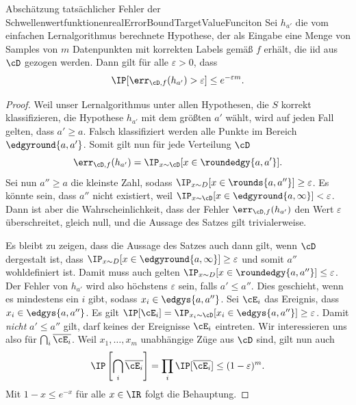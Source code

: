 \documentclass[language=ngerman,algolist,acrolist]{TemplateLecture}
\begin{document}
\begin{thm}{Abschätzung tatsächlicher Fehler der Schwellenwertfunktionen}{realErrorBoundTargetValueFunciton}
    Sei $h_{a'}$ die vom einfachen Lernalgorithmus berechnete Hypothese, der als Eingabe eine Menge von Samples von $m$ Datenpunkten mit korrekten Labels gemäß $f$ erhält, die \ac{iid} aus $\cD$ gezogen werden. Dann gilt für alle $\varepsilon > 0$, dass
    \begin{equation*}
        \IP[\err_{\cD, f}(h_{a'}) > \varepsilon] \leq e^{-\varepsilon m}.
    \end{equation*}
\end{thm}
\begin{proof}
    Weil unser Lernalgorithmus unter allen Hypothesen, die $S$ korrekt klassifizieren, die Hypothese $h_{a'}$ mit dem größten $a'$ wählt, wird auf jeden Fall gelten, dass $a' \geq a$. Falsch klassifiziert werden alle Punkte im Bereich $\edgyround{a, a'}$. Somit gilt nun für jede Verteilung $\cD$
    \begin{equation*}
        \err_{\cD, f}(h_{a'}) = \IP_{x \sim \cD}[x \in \roundedgy{a, a'}].
    \end{equation*}
    Sei nun $a'' \geq a$ die kleinste Zahl, sodass $\IP_{x \sim D}[x \in \rounds{a, a''}] \geq \varepsilon$. Es könnte sein, dass $a''$ nicht existiert, weil $\IP_{x \sim \cD}[x \in \edgyround{a, \infty}] < \varepsilon$. Dann ist aber die Wahrscheinlichkeit, dass der Fehler $\err_{\cD,f} (h_{a'})$ den Wert $\varepsilon$ überschreitet, gleich null, und die Aussage des Satzes gilt trivialerweise.

    Es bleibt zu zeigen, dass die Aussage des Satzes auch dann gilt, wenn $\cD$ dergestalt ist, dass $\IP_{x \sim D} [x \in \edgyround{a,\infty}] \geq \varepsilon$ und somit $a''$ wohldefiniert ist. Damit muss auch gelten $\IP_{x\sim D} [x \in \roundedgy{a, a''}] \leq \varepsilon$. Der Fehler von $h_{a'}$ wird also höchstens $\varepsilon$ sein, falls $a' \leq a''$. Dies geschieht, wenn es mindestens ein $i$ gibt, sodass $x_i \in \edgys{a, a''}$. Sei $\cE_i$ das Ereignis, dass $x_i \in \edgys{a, a''}$. Es gilt $\IP[\cE_i] = \IP_{x_i \sim \cD} [x_i \in \edgys{a, a''}] \geq \varepsilon$.
    Damit \emph{nicht} $a' \leq a''$ gilt, darf keines der Ereignisse $\cE_i$ eintreten. Wir interessieren uns also für $\bigcap_i \overline{\cE_i}$. Weil $x_1, \dots , x_m$ unabhängige Züge aus $\cD$ sind, gilt nun auch
    \begin{equation*}
        \IP\left[ \bigcap_i \overline{\cE_i} \right] = \prod_i \IP[\overline{\cE_i}] \leq (1 - \varepsilon)^m.
    \end{equation*}
    Mit $1 - x \leq e^{-x}$ für alle $x \in \IR$ folgt die Behauptung.
\end{proof}
\end{document}
